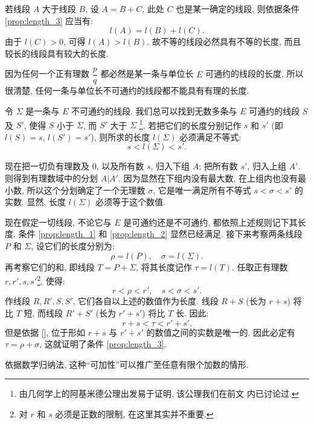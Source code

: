若线段 $A$ 大于线段 $B$, 设 $A = B + C$, 此处 $C$ 也是某一确定的线段,
则依据条件 \ref{prop:length_3} 应当有:
$$ l(A) = l(B) + l(C). $$
由于 $l(C) > 0$, 可得 $l(A) > l(B)$.
故不等的线段必然具有不等的长度, 而且较长的线段具有较大的长度.

因为任何一个正有理数 $\dfrac{p}{q}$ 都必然是某一条与单位长 $E$ 可通约的线段的长度,
所以很清楚, 任何一条与单位长不可通约的线段都不能具有有理的长度.

令 $\Sigma$ 是一条与 $E$ 不可通约的线段.
我们总可以找到无数多条与 $E$ 可通约的线段 $S$ 及 $S'$,
使得 $S$ 小于 $\Sigma$, 而 $S'$ 大于 $\Sigma$
\footnote{由几何学上的阿基米德公理出发易于证明, 该公理我们在前文  内已讨论过.}.
若把它们的长度分别记作 $s$ 和 $s'$ (即 $l(S) = s$, $l(S') = s'$),
则所求的长度 $l(\Sigma)$ 必须满足不等式:
$$ s < l(\Sigma) < s'. $$

现在把一切负有理数及 $0$, 以及所有数 $s$, 归入下组 $A$;
把所有数 $s'$, 归入上组 $A'$.
则得到有理数域中的分划 $A|A'$.
因为显然在下组内没有最大数, 在上组内也没有最小数,
所以这个分划确定了一个无理数 $\sigma$,
它是唯一满足所有不等式 $s < \sigma < s'$ 的实数.
显然, 长度 $l(\Sigma)$ 必须等于这个数值.

现在假定一切线段, 不论它与 $E$ 是可通约还是不可通约, 都依照上述规则记下其长度.
条件 \ref{prop:length_1} 和 \ref{prop:length_2} 显然已经满足.
接下来考察两条线段 $P$ 和 $\Sigma$, 设它们的长度分别为:
$$ \rho = l(P), \quad \sigma = l(\Sigma). $$
再考察它们的和, 即线段 $T = P + \Sigma$, 将其长度记作 $\tau = l(T)$.
任取正有理数 $r, r', s, s'$\footnote{对 $r$ 和 $s$ 必须是正数的限制, 在这里其实并不重要.}, 使得:
$$ r < \rho < r', \quad s < \sigma < s'. $$
作线段 $R, R', S, S'$, 它们各自以上述的数值作为长度.
线段 $R + S$ (长为 $r + s$) 将比 $T$ 短,
而线段 $R' + S'$ (长为 $r' + s'$) 将比 $T$ 长.
因此:
$$ r + s < \tau < r' + s'. $$
但是依据 [],
位于形如 $r + s$ 与 $r' + s'$ 的数值之间的实数是唯一的.
因此必定有 $\tau = \rho + \sigma$, 这就证明了条件 \ref{prop:length_3}.

依据数学归纳法, 这种“可加性”可以推广至任意有限个加数的情形.

